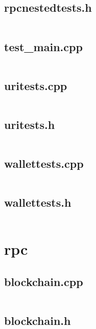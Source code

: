 \documentclass{article}
\begin{document}
\subsection{rpcnestedtests.h}
\inputminted{cpp}{/home/dufferzafar/dev/@clones/bitcoin/src/qt/test/rpcnestedtests.h}
\newpage

\subsection{test\_main.cpp}
\inputminted{cpp}{/home/dufferzafar/dev/@clones/bitcoin/src/qt/test/test_main.cpp}
\newpage

\subsection{uritests.cpp}
\inputminted{cpp}{/home/dufferzafar/dev/@clones/bitcoin/src/qt/test/uritests.cpp}
\newpage

\subsection{uritests.h}
\inputminted{cpp}{/home/dufferzafar/dev/@clones/bitcoin/src/qt/test/uritests.h}
\newpage

\subsection{wallettests.cpp}
\inputminted{cpp}{/home/dufferzafar/dev/@clones/bitcoin/src/qt/test/wallettests.cpp}
\newpage

\subsection{wallettests.h}
\inputminted{cpp}{/home/dufferzafar/dev/@clones/bitcoin/src/qt/test/wallettests.h}
\newpage

\section{rpc}

\subsection{blockchain.cpp}
\inputminted{cpp}{/home/dufferzafar/dev/@clones/bitcoin/src/rpc/blockchain.cpp}
\newpage

\subsection{blockchain.h}
\inputminted{cpp}{/home/dufferzafar/dev/@clones/bitcoin/src/rpc/blockchain.h}
\newpage
\end{document}
